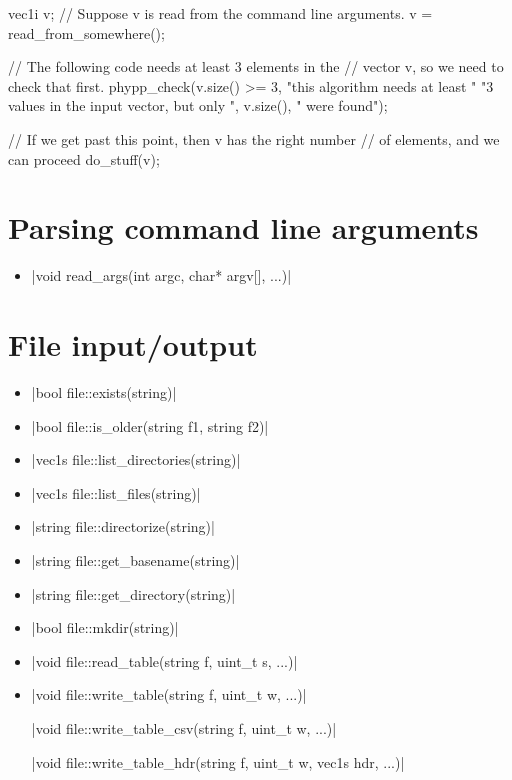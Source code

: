 \documentclass[12pt]{report}
\newcommand*\circled[1]{\tikz[baseline=(char.base)]{
            \node[shape=circle,draw,inner sep=0.0pt] (char) {#1};}}
\newcommand{\vectorfuncsym}{\circled{$\hspace{-1pt}\mathcal{V}$}\xspace}
\newcommand{\vectorfunc}{\vectorfuncsym\hspace{2pt}\xspace}
\newenvironment{example}
{
    \begin{mdframed}[style=example,frametitle={Example}]
}
{
    \end{mdframed}
}
\begin{document}
\begin{itemize}
\begin{example}
\begin{cppcode}
vec1i v;
// Suppose v is read from the command line arguments.
v = read_from_somewhere();

// The following code needs at least 3 elements in the
// vector v, so we need to check that first.
phypp_check(v.size() >= 3, "this algorithm needs at least "
    "3 values in the input vector, but only ", v.size(),
    " were found");

// If we get past this point, then v has the right number
// of elements, and we can proceed
do_stuff(v);
\end{cppcode}
\end{example}
\end{itemize}

\section{Parsing command line arguments \label{SEC:support:cmd}}

\begin{itemize}
\item \cppinline|void read_args(int argc, char* argv[], ...)| 
\end{itemize}

\section{File input/output \label{SEC:support:file}}

\begin{itemize}
\item \vectorfunc \cppinline|bool file::exists(string)| 
\item \cppinline|bool file::is_older(string f1, string f2)| 
\item \cppinline|vec1s file::list_directories(string)| 
\item \cppinline|vec1s file::list_files(string)| 
\item \vectorfunc \cppinline|string file::directorize(string)| 
\item \vectorfunc \cppinline|string file::get_basename(string)| 
\item \vectorfunc \cppinline|string file::get_directory(string)| 
\item \vectorfunc \cppinline|bool file::mkdir(string)| 
\item \cppinline|void file::read_table(string f, uint_t s, ...)| 
\item \cppinline|void file::write_table(string f, uint_t w, ...)| 

\cppinline|void file::write_table_csv(string f, uint_t w, ...)| 

\cppinline|void file::write_table_hdr(string f, uint_t w, vec1s hdr, ...)| 
\end{itemize}
\end{document}

